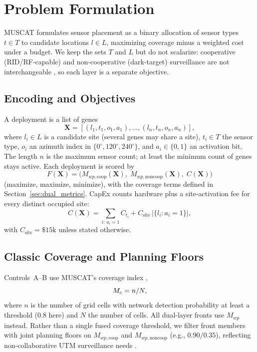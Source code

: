 
\section{Problem Formulation}

MUSCAT \cite{muscat2023} formulates sensor placement as a binary allocation of sensor types \(t\in T\) to candidate locations \(l\in L\), maximizing coverage minus a weighted cost under a budget. We keep the sets \(T\) and \(L\) but do not scalarize: cooperative (RID/RF-capable) and non-cooperative (dark-target) surveillance are not interchangeable \cite{besada2022cuas,blasch2021information,dulia2024sand}, so each layer is a separate objective.

\subsection{Encoding and Objectives}

A deployment is a list of genes
\begin{equation}
\textbf{X} = [(l_1, t_1, o_1, a_1), \ldots, (l_{n}, t_{n}, o_{n}, a_{n})],
\label{eq:chromosome}
\end{equation}
where \(l_i\in L\) is a candidate site (several genes may share a site), \(t_i\in T\) the sensor type, \(o_i\) an azimuth index in \(\{0^{\circ},120^{\circ},240^{\circ}\}\), and \(a_i\in\{0,1\}\) an activation bit. The length \(n\) is the maximum sensor count; at least the minimum count of genes stays active. Each deployment is scored by
\begin{equation}
F(\textbf{X}) = \bigl(M_{wp,\mathrm{coop}}(\textbf{X}),\; M_{wp,\mathrm{noncoop}}(\textbf{X}),\; C(\textbf{X})\bigr)
\label{eq:fitness}
\end{equation}
(maximize, maximize, minimize), with the coverage terms defined in Section~\ref{sec:dual_metrics}. CapEx counts hardware plus a site-activation fee for every distinct occupied site:
\begin{equation}
C(\textbf{X}) = \sum_{i:\,a_i=1} C_{t_i} + C_{\mathrm{site}}\,\bigl|\{l_i : a_i = 1\}\bigr|,
\label{eq:capex}
\end{equation}
with \(C_{\mathrm{site}}=\$15\mathrm{k}\) unless stated otherwise.

\subsection{Classic Coverage and Planning Floors}

Controls~A--B use MUSCAT's coverage index \cite{muscat2023},
\begin{equation}
M_c = n/N,
\label{eq:coverage_index}
\end{equation}
where \(n\) is the number of grid cells with network detection probability at least a threshold (0.8 here) and \(N\) the number of cells. All dual-layer fronts use \(M_{wp}\) instead. Rather than a single fused coverage threshold, we filter front members with joint planning floors on \(M_{wp,\mathrm{coop}}\) and \(M_{wp,\mathrm{noncoop}}\) (e.g., \(0.90/0.35\)), reflecting non-collaborative UTM surveillance needs \cite{besada2022cuas}.

